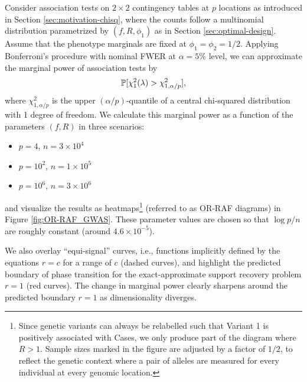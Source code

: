 \begin{example}
\label{exmp:OR-RAF_phase_transition}
Consider association tests on $2\times2$ contingency tables at $p$ locations as introduced in Section \ref{sec:motivation-chisq}, where the counts follow 
a multinomial distribution
parametrized by $(f, R, \phi_1)$ as in Section \ref{sec:optimal-design}.
Assume that the phenotype marginals are fixed at $\phi_1 = \phi_2 = 1/2$.
Applying Bonferroni's procedure with nominal FWER at $\alpha=5\%$ level, we can approximate the marginal power of association tests by
\begin{equation} \label{eq:power-approximation}
    \P[\chi^2_{1}(\lambda)>\chi^2_{1,\alpha/p}],
\end{equation}
where $\chi^2_{1,\alpha/p}$ is the upper $(\alpha/p)$-quantile of a central chi-squared distribution with 1 degree of freedom.
We calculate this marginal power as a function of the parameters $(f,R)$ in three scenarios:
\begin{itemize}
    \item $p=4$, $n=3\times10^4$ 
    \item $p=10^2$, $n=1\times10^5$
    \item $p=10^6$, $n=3\times10^6$
\end{itemize}
and visualize the results as heatmaps\footnote{Since genetic variants can always be relabelled such that Variant 1 is positively associated with Cases, we only produce part of the diagram where $R>1$.
Sample sizes marked in the figure are adjusted by a factor of $1/2$, to reflect the genetic context where a pair of alleles are measured for every individual at every genomic location.} (referred to as OR-RAF diagrams) in Figure \ref{fig:OR-RAF_GWAS}.
These parameter values are chosen so that $\log{p}/n$ are roughly constant (around $4.6\times10^{-5}$).

We also overlay ``equi-signal'' curves, i.e., functions implicitly defined by the equations $r=c$ for a range of $c$ (dashed curves), and highlight the predicted boundary of phase transition for the exact-approximate support recovery problem $r=1$ (red curves).
The change in marginal power clearly sharpens around the predicted boundary $r=1$ as dimensionality diverges.
\end{example}



